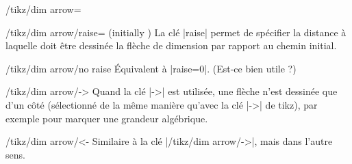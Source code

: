 \documentclass[a4paper]{ltxdoc}
\begin{document}
\begin{stylekey}{/tikz/dim arrow=}
  \begin{key}{/tikz/dim arrow/raise= (initially )}
  La clé |raise| permet de spécifier la distance  à laquelle doit être dessinée la flèche de dimension par rapport au chemin initial.
  \begin{codeexample}[]
\end{codeexample}
  \end{key}

  \begin{stylekey}{/tikz/dim arrow/no raise}
  Équivalent à |raise=0|. (Est-ce bien utile ?)
  \end{stylekey}

  \begin{key}{/tikz/dim arrow/->}
  Quand la clé |->| est utilisée, une flèche n'est dessinée que d'un côté (sélectionné de la même manière qu'avec la clé |->| de tikz), par exemple pour marquer une grandeur algébrique.
  \begin{codeexample}[]
\end{codeexample}
  \end{key}

    \begin{key}{/tikz/dim arrow/<-}
  Similaire à la clé |/tikz/dim arrow/->|, mais dans l'autre sens.
  \end{key}

\end{stylekey}
\end{document}
